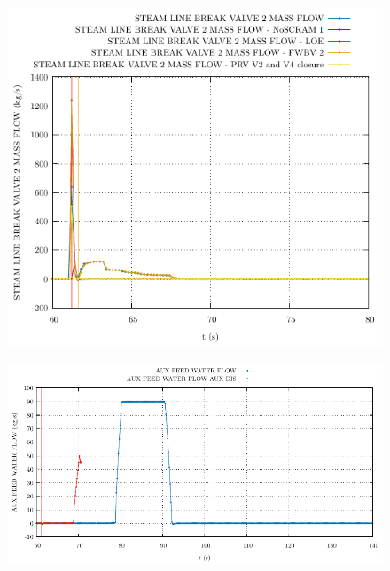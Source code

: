 \documentclass{article}
\begin{document}
\begin{multicols}{2}
\begin{figure}[H]
\centering
\includegraphics[width=\linewidth]{./graphs/STEAM LINE BREAK VALVE 2 MASS FLOW.pdf}
\end{figure}
\begin{figure}[H]
\centering
\includegraphics[width=\linewidth]{./graphs/merged.pdf}
\end{figure}
\end{multicols}
\end{document}
